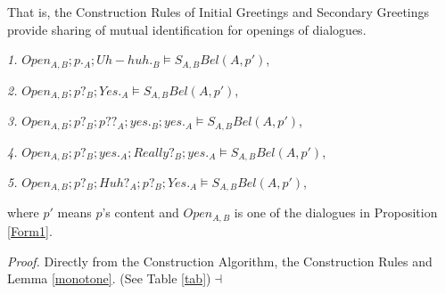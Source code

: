 \par
That is, the Construction Rules of Initial Greetings and Secondary Greetings provide sharing of mutual identification for openings of dialogues.
\begin{PROP}\label{Form2}
\begin{list}{}{\leftmargin=10mm }
\item[]
\item [{\it 1.}] $Open_{A,B};p._A;Uh-huh._B\models S_{A,B}Bel(A,p')$,
\item [{\it 2.}] $Open_{A,B};p?_B;Yes._A\models S_{A,B}Bel(A,p')$,
\item [{\it 3.}] $Open_{A,B};p?_B;p??_A;yes._B;yes._A\models S_{A,B}Bel(A,p')$,
\item [{\it 4.}] $Open_{A,B};p?_B;yes._A;Really?_B;yes._A\models S_{A,B}Bel(A,p')$,
\item [{\it 5.}] $Open_{A,B};p?_B;Huh?_A;p?_B;Yes._A\models S_{A,B}Bel(A,p')$,
\end{list}
\rm where $p'$ means $p$'s content and $Open_{A,B}$ is one of the dialogues in  Proposition \ref{Form1}.
\end{PROP}
\par
{\it Proof.} Directly from the Construction Algorithm, the Construction Rules and Lemma \ref{monotone}. (See Table \ref{tab})$\dashv$

